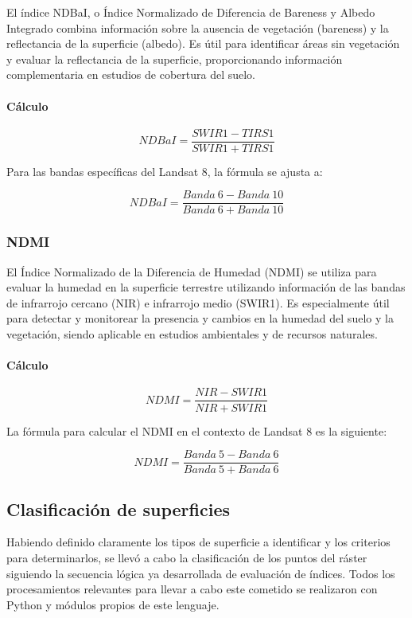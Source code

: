 El índice NDBaI, o Índice Normalizado de Diferencia de Bareness y Albedo Integrado combina información sobre la ausencia de vegetación (bareness) y la reflectancia de la superficie (albedo). Es útil para identificar áreas sin vegetación y evaluar la reflectancia de la superficie, proporcionando información complementaria en estudios de cobertura del suelo.

\paragraph{Cálculo}

$$NDBaI=\frac{SWIR1-TIRS1}{SWIR1+TIRS1}$$

Para las bandas específicas del Landsat 8, la fórmula se ajusta a:

$$NDBaI=\frac{Banda~6-Banda~10}{Banda~6+Banda~10}$$

\subsubsection{NDMI}

El Índice Normalizado de la Diferencia de Humedad (NDMI) se utiliza para evaluar la humedad en la superficie terrestre utilizando información de las bandas de infrarrojo cercano (NIR) e infrarrojo medio (SWIR1). Es especialmente útil para detectar y monitorear la presencia y cambios en la humedad del suelo y la vegetación, siendo aplicable en estudios ambientales y de recursos naturales.

\paragraph{Cálculo}

$$NDMI=\frac{NIR-SWIR1}{NIR+SWIR1}$$

La fórmula para calcular el NDMI en el contexto de Landsat 8 es la siguiente:

$$NDMI=\frac{Banda~5-Banda~6}{Banda~5+Banda~6}$$

\subsection{Clasificación de superficies}

Habiendo definido claramente los tipos de superficie a identificar y los criterios para determinarlos, se llevó a cabo la clasificación de los puntos del ráster siguiendo la secuencia lógica ya desarrollada de evaluación de índices. Todos los procesamientos relevantes para llevar a cabo este cometido se realizaron con Python y módulos propios de este lenguaje.

